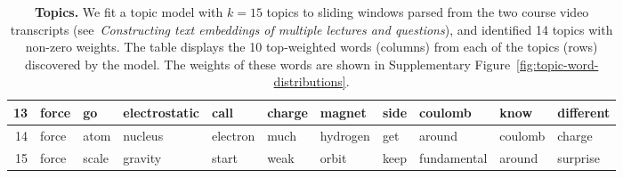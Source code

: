 \documentclass[10pt]{article}
\newcommand{\topicModelMethods}{\textit{Constructing text embeddings of multiple lectures and questions}}
\begin{document}
\begin{table}[tp]
\begin{tiny}
\begin{tabular}{|r|l|l|l|l|l|l|l|l|l|l|}
            13 &      force &         go &   electrostatic &        call &     charge &     magnet &          side &     coulomb &       know &       different \\\hline
            14 &      force &       atom &         nucleus &    electron &       much &   hydrogen &           get &      around &    coulomb &          charge \\\hline
            15 &      force &      scale &         gravity &       start &       weak &      orbit &          keep & fundamental &     around &        surprise \\\hline
    \end{tabular}    
    \end{tiny}

    \caption{\textbf{Topics.} We fit a topic model with $k = 15$ topics
    to sliding windows parsed from the two course video transcripts
    (see~\topicModelMethods), and identified 14 topics with non-zero weights.
    The table displays the 10 top-weighted words (columns) from each of the
    topics (rows) discovered by the model. The weights of these words are shown
    in Supplementary Figure~\ref{fig:topic-word-distributions}.}


    \label{tab:topics}
\end{table}

\newpage
\end{document}
